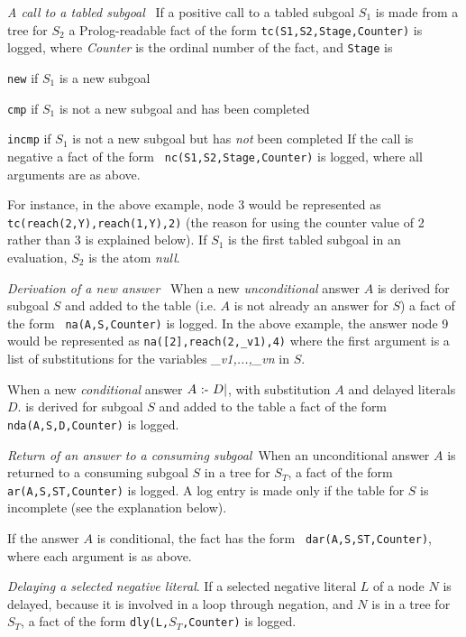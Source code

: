 \bi
\item {\em A call to a tabled subgoal}~ If a positive call to a tabled
  subgoal $S_1$ is made from a tree for $S_2$ a Prolog-readable fact
  of the form {\tt tc(S1,S2,Stage,Counter)} is logged, where {\em
    Counter} is the ordinal number of the fact, and {\tt Stage} is
\bi
\item {\tt new} if $S_1$ is a new subgoal
\item {\tt cmp} if $S_1$ is not a new subgoal and has been completed
\item {\tt incmp} if $S_1$ is not a new subgoal but has {\em not} been
  completed 
\ei 
%
If the call is negative a fact of the form {\tt
  nc(S1,S2,Stage,Counter)} is logged, where all arguments are as
above.

  For instance, in the above example, node 3 would be represented as
  {\tt tc(reach(2,Y),reach(1,Y),2)} (the reason for using the counter
  value of 2 rather than 3 is explained below).  If $S_1$ is the first
  tabled subgoal in an evaluation, $S_2$ is the atom {\em null}.

\item {\em Derivation of a new answer}~ When a new {\em unconditional}
  answer $A$ is derived for subgoal $S$ and added to the table
  (i.e. $A$ is not already an answer for $S$) a fact of the form {\tt
    na(A,S,Counter)} is logged.  In the above example, the answer node
  9 would be represented as {\tt na([2],reach(2,\_v1),4)} where the
  first argument is a list of substitutions for the variables {\em
    \_v1,...,\_vn} in $S$.

  When a new {\em conditional} answer $A \mbox{ :- } D|$, with substitution
  $A$ and delayed literals $D$. is derived for subgoal $S$ and added
  to the table a fact of the form {\tt nda(A,S,D,Counter)} is logged.

\item {\em Return of an answer to a consuming subgoal}~When an
  unconditional answer $A$ is returned to a consuming subgoal $S$ in a
  tree for $S_T$, a fact of the form {\tt ar(A,S,ST,Counter)} is
  logged.  A log entry is made only if the table for $S$ is incomplete
  (see the explanation below).

  If the answer $A$ is conditional, the fact has the form {\tt
    dar(A,S,ST,Counter)}, where each argument is as above.

\item {\em Delaying a selected negative literal}.  If a selected
  negative literal $L$ of a node $N$ is delayed, because it is
  involved in a loop through negation, and $N$ is in a tree for $S_T$,
  a fact of the form {\tt dly(L,$S_T$,Counter)} is logged.

